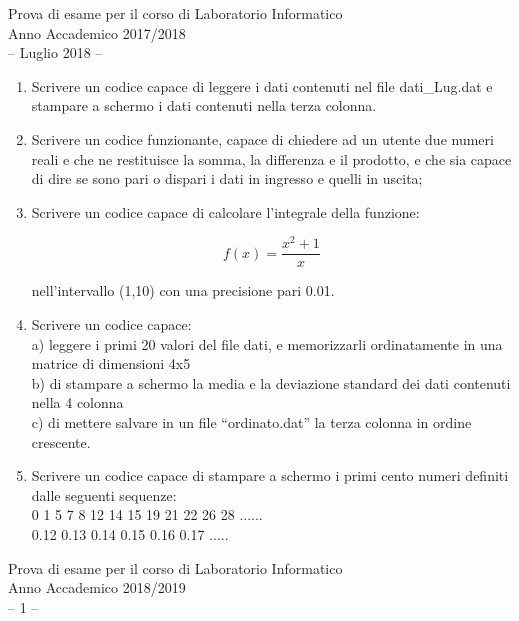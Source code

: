 \documentclass[11pt,fleqn]{book} %
\begin{document}
{
\Large\centering
Prova di esame per il corso di Laboratorio Informatico\\		
Anno Accademico 2017/2018\\
-- Luglio 2018 --\\
}


\begin{enumerate}
\item Scrivere un codice capace di  leggere i dati contenuti nel file  dati\_Lug.dat e stampare a schermo i dati contenuti nella terza colonna.

\item Scrivere un codice funzionante, capace di chiedere ad un utente due numeri reali e che ne restituisce la somma, la differenza e il prodotto, e che sia capace di dire se sono pari o dispari i dati in ingresso e quelli in uscita; 

\item Scrivere un codice capace di calcolare l'integrale della funzione:

$$f(x) = \frac{x^2+1}{x}$$ 

nell'intervallo (1,10) con una precisione pari 0.01. 

\item Scrivere un codice capace:\\
     a) leggere i primi 20 valori del file dati, e memorizzarli ordinatamente in una matrice di dimensioni 4x5\\
     b) di stampare a schermo la media e la deviazione standard dei dati contenuti nella 4 colonna\\
     c) di mettere salvare in un file “ordinato.dat” la terza colonna in ordine crescente. 

\item Scrivere un codice capace di stampare a schermo i primi cento numeri definiti dalle seguenti sequenze:\\
0 1 5 7 8 12 14 15 19 21 22 26 28 ......\\ 
0.12  0.13  0.14  0.15  0.16  0.17 .....\\


\end{enumerate}




{
\Large\centering
Prova di esame per il corso di Laboratorio Informatico\\		
Anno Accademico 2018/2019\\
-- 1 --\\
}
\end{document}
